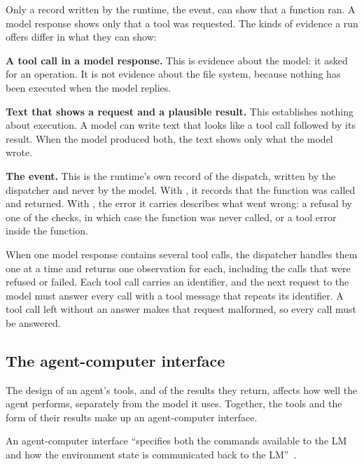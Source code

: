 Only a record written by the runtime, the  event, can show that a function ran.
A model response shows only that a tool was requested. The kinds of evidence a run offers differ in
what they can show:
\bi
\item \textbf{A tool call in a model response.} This is evidence about the model: it asked for an
operation. It is not evidence about the file system, because nothing has been executed when the
model replies.
\item \textbf{Text that shows a request and a plausible result.} This establishes nothing about
execution. A model can write text that looks like a tool call followed by its result. When the model
produced both, the text shows only what the model wrote.
\item \textbf{The  event.} This is the runtime's own record of the dispatch,
written by the dispatcher and never by the model. With , it records that the
function was called and returned. With , the error it carries describes what went
wrong: a refusal by one of the checks, in which case the function was never called, or a tool error
inside the function.
\ei

When one model response contains several tool calls, the dispatcher handles them one at a time and
returns one observation for each, including the calls that were refused or failed. Each tool call
carries an identifier, and the next request to the model must answer every call with a tool message
that repeats its identifier. A tool call left without an answer makes that request malformed, so
every call must be answered.

\subsection{The agent-computer interface}
\label{sec:boundary-aci}

The design of an agent's tools, and of the results they return, affects how well the agent performs,
separately from the model it uses. Together, the tools and the form of their results make up an
agent-computer interface.

\begin{definition}
\label{def:boundary-aci}
An agent-computer interface ``specifies both the commands available to the LM and how the
environment state is communicated back to the LM''~\citep[\S2]{yang2024sweagent}.
\end{definition}

